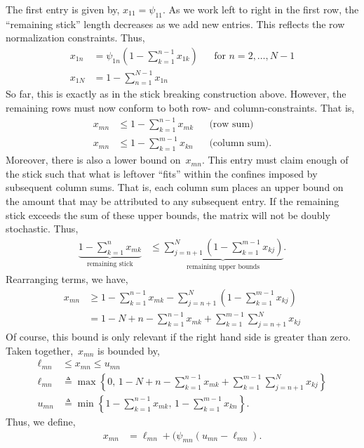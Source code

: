 The first entry is given by, $x_{11} = \psi_{11}$.  As we work left to
right in the first row, the ``remaining stick'' length decreases as we
add new entries. This reflects the row normalization constraints.
Thus,
\begin{align}
  x_{1n} &= \psi_{1n} \left(1 - \sum_{k=1}^{n-1} x_{1k} \right)  & &  \text{for } n=2, \ldots, N-1\\
  x_{1N} &= 1 - \sum_{n=1}^{N-1} x_{1n}
\end{align}
So far, this is exactly as in the stick breaking construction
above. However, the remaining rows must now conform to both row- and
column-constraints. That is,
\begin{align}
x_{mn} &\leq 1- \sum_{k=1}^{n-1} x_{mk} & & \text{(row sum)} \\
x_{mn} &\leq 1- \sum_{k=1}^{m-1} x_{kn} & & \text{(column sum)}.
\end{align}
Moreover, there is also a lower bound on~$x_{mn}$. This entry must
claim enough of the stick such that what is leftover ``fits'' within
the confines imposed by subsequent column sums. That is, each column
sum places an upper bound on the amount that may be attributed to any
subsequent entry. If the remaining stick exceeds the sum of these
upper bounds, the matrix will not be doubly stochastic.  Thus,
\begin{align}
\underbrace{1 - \sum_{k=1}^n x_{mk}}_{\text{remaining stick}}
  &\leq \underbrace{\sum_{j=n+1}^N (1- \sum_{k=1}^{m-1} x_{kj})}_{
    \text{remaining upper bounds}}.
\end{align}
Rearranging terms, we have,
\begin{align}
x_{mn} &\geq 1- \sum_{k=1}^{n-1} x_{mk} - \sum_{j=n+1}^N (1- \sum_{k=1}^{m-1} x_{kj}) \\
&= 1 - N + n - \sum_{k=1}^{n-1} x_{mk}  +  \sum_{k=1}^{m-1} \sum_{j=n+1}^N x_{kj}
\end{align}
Of course, this bound is only relevant if the right hand side is greater than zero.
Taken together,~$x_{mn}$ is bounded by,
\begin{align}
\ell_{mn} &\leq x_{mn} \leq u_{mn} \\
\ell_{mn} &\triangleq \max \left \{0, \, 1 - N + n - \sum_{k=1}^{n-1} x_{mk}  +  \sum_{k=1}^{m-1} \sum_{j=n+1}^N x_{kj} \right \}
\\
u_{mn} &\triangleq 
\min \left \{1- \sum_{k=1}^{n-1} x_{mk}, \,
1- \sum_{k=1}^{m-1} x_{kn} \right\}.
\end{align}
Thus, we define,
\begin{align}
  x_{mn} &= \ell_{mn} + (\psi_{mn} (u_{mn} - \ell_{mn}).
\end{align}

